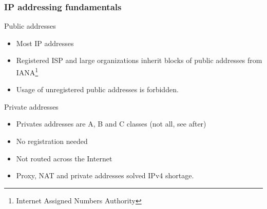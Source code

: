  \begin{frame}
    \frametitle{IP addressing fundamentals}
    \begin{block}{Public addresses}
      \begin{itemize}
        \item Most IP addresses
        \item Registered ISP and large organizations inherit blocks of public addresses from IANA\footnote{Internet Assigned Numbers Authority}
        \item Usage of unregistered public addresses is forbidden.
      \end{itemize}
    \end{block}
    \begin{block}{Private addresses}
      \begin{itemize}
        \item Privates addresses are A, B and C classes (not all, see after)
        \item No registration needed
        \item Not routed across the Internet
        \item Proxy, NAT and private addresses solved IPv4 shortage.
      \end{itemize}
    \end{block}
  \end{frame}

